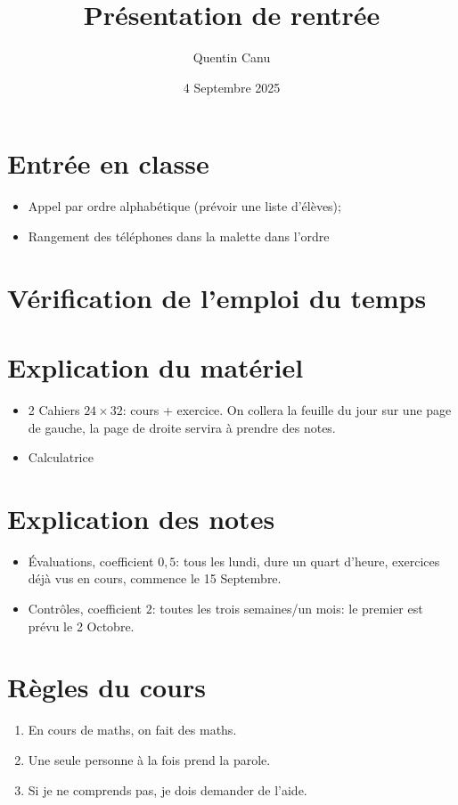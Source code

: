 \documentclass{article}
\title{Présentation de rentrée}
\date{4 Septembre 2025}
\author{Quentin Canu}
\begin{document}
\maketitle
\section{Entrée en classe}
\begin{itemize}
\item Appel par ordre alphabétique (prévoir une liste d'élèves);
\item Rangement des téléphones dans la malette dans l'ordre
\end{itemize}
\section{Vérification de l'emploi du temps}
\section{Explication du matériel}
\begin{itemize}
\item 2 Cahiers $24 \times 32$: cours + exercice. On collera la feuille du jour sur une page de gauche, la page de droite servira à prendre des notes.
\item Calculatrice
\end{itemize}
\section{Explication des notes}
\begin{itemize}
\item Évaluations, coefficient $0,5$: tous les lundi, dure un quart d'heure, exercices déjà vus en cours, commence le 15 Septembre.
\item Contrôles, coefficient $2$: toutes les trois semaines/un mois: le premier est prévu le 2 Octobre.
\end{itemize}
\section{Règles du cours}
\begin{enumerate}
\item En cours de maths, on fait des maths.
\item Une seule personne à la fois prend la parole.
\item Si je ne comprends pas, je dois demander de l'aide.
\end{enumerate}
\end{document}
